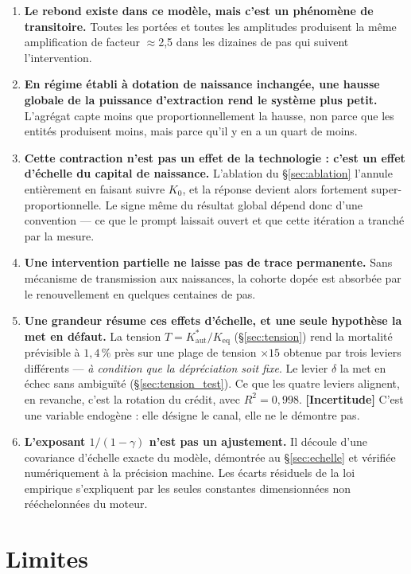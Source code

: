 \documentclass[11pt,a4paper]{article}
\newcommand{\Kaut}{K^{*}_{\mathrm{aut}}}
\newcommand{\incertitude}{\textbf{[Incertitude]}}
\begin{document}
\begin{enumerate}
\item \textbf{Le rebond existe dans ce modèle, mais c'est un phénomène de
  transitoire.} Toutes les portées et toutes les amplitudes produisent la
  même amplification de facteur $\approx$2,5 dans les dizaines de pas qui
  suivent l'intervention.
\item \textbf{En régime établi à dotation de naissance inchangée, une
  hausse globale de la puissance d'extraction rend le système plus petit.}
  L'agrégat capte moins que proportionnellement la hausse, non parce que les
  entités produisent moins, mais parce qu'il y en a un quart de moins.
\item \textbf{Cette contraction n'est pas un effet de la technologie : c'est
  un effet d'échelle du capital de naissance.} L'ablation du
  §\ref{sec:ablation} l'annule entièrement en faisant suivre $K_0$, et la
  réponse devient alors fortement super-proportionnelle. Le signe même du
  résultat global dépend donc d'une convention --- ce que le prompt laissait
  ouvert et que cette itération a tranché par la mesure.
\item \textbf{Une intervention partielle ne laisse pas de trace
  permanente.} Sans mécanisme de transmission aux naissances, la cohorte
  dopée est absorbée par le renouvellement en quelques centaines de pas.
\item \textbf{Une grandeur résume ces effets d'échelle, et une seule
  hypothèse la met en défaut.} La tension $T = \Kaut/K_{\text{eq}}$
  (§\ref{sec:tension}) rend la mortalité prévisible à $1{,}4\,\%$ près sur
  une plage de tension $\times15$ obtenue par trois leviers différents ---
  \emph{à condition que la dépréciation soit fixe}. Le levier $\delta$ la met
  en échec sans ambiguïté (§\ref{sec:tension_test}). Ce que les quatre
  leviers alignent, en revanche, c'est la rotation du crédit, avec
  $R^2 = 0{,}998$. \incertitude{} C'est une variable endogène : elle désigne
  le canal, elle ne le démontre pas.
\item \textbf{L'exposant $1/(1-\gamma)$ n'est pas un ajustement.} Il découle
  d'une covariance d'échelle exacte du modèle, démontrée au
  §\ref{sec:echelle} et vérifiée numériquement à la précision machine. Les
  écarts résiduels de la loi empirique s'expliquent par les seules
  constantes dimensionnées non rééchelonnées du moteur.
\end{enumerate}

\section{Limites}
\end{document}
